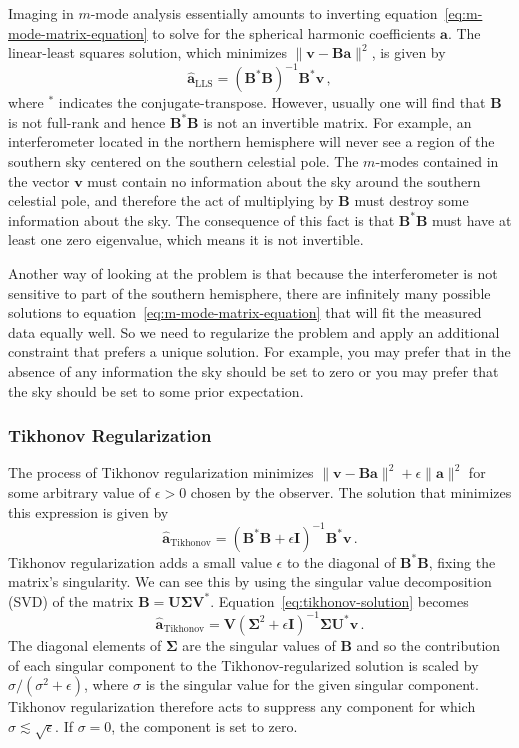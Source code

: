 \documentclass[twocolumn]{aastex6}
\renewcommand{\b}{\pmb}
\newcommand{\atikh}{\b{\hat a}_\text{Tikhonov}}
\begin{document}
Imaging in $m$-mode analysis essentially amounts to inverting
equation~\ref{eq:m-mode-matrix-equation} to solve for the spherical harmonic coefficients $\b a$.
The linear-least squares solution, which minimizes $\|\b v - \b B\b a\|^2$, is given by
\begin{equation}
    \b{\hat a}_\text{LLS} = (\b B^*\b B)^{-1}\b B^*\b v\,,
\end{equation}
where $^*$ indicates the conjugate-transpose. However, usually one will find that $\b B$ is not
full-rank and hence $\b B^*\b B$ is not an invertible matrix. For example, an interferometer located
in the northern hemisphere will never see a region of the southern sky centered on the southern
celestial pole. The $m$-modes contained in the vector $\b v$ must contain no information
about the sky around the southern celestial pole, and therefore the act of multiplying by $\b B$
must destroy some information about the sky. The consequence of this fact is that $\b B^*\b B$ must
have at least one zero eigenvalue, which means it is not invertible.

Another way of looking at the problem is that because the interferometer is not sensitive to part of
the southern hemisphere, there are infinitely many possible solutions to
equation~\ref{eq:m-mode-matrix-equation} that will fit the measured data equally well. So we need to
regularize the problem and apply an additional constraint that prefers a unique solution. For
example, you may prefer that in the absence of any information the sky should be set to zero or you
may prefer that the sky should be set to some prior expectation.

\subsubsection{Tikhonov Regularization}

The process of Tikhonov regularization minimizes $\|\b v - \b B\b a\|^2 + \epsilon\|\b a\|^2$ for
some arbitrary value of $\epsilon > 0$ chosen by the observer. The solution that minimizes this
expression is given by
\begin{equation}\label{eq:tikhonov-solution}
    \atikh = (\b B^*\b B + \epsilon\b I)^{-1}\b B^*\b v\,.
\end{equation}
Tikhonov regularization adds a small value $\epsilon$ to the diagonal of $\b B^*\b B$, fixing the
matrix's singularity. We can see this by using the singular value decomposition (SVD) of the matrix
$\b B = \b U \b \Sigma \b V^*$. Equation~\ref{eq:tikhonov-solution} becomes
\[
    \atikh = \b V (\b\Sigma^2 + \epsilon \b I)^{-1}\b\Sigma \b U^*\b v\,.
\]
The diagonal elements of $\b\Sigma$ are the singular values of $\b B$ and so the contribution of
each singular component to the Tikhonov-regularized solution is scaled by $\sigma / (\sigma^2 +
\epsilon)$, where $\sigma$ is the singular value for the given singular component. Tikhonov
regularization therefore acts to suppress any component for which $\sigma\lesssim\sqrt{\epsilon}$.
If $\sigma = 0$, the component is set to zero.
\end{document}
